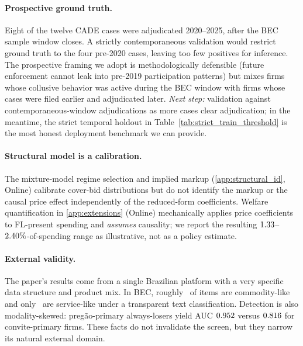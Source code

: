 \paragraph{Prospective ground truth.}
Eight of the twelve CADE cases were adjudicated 2020--2025,
after the BEC sample window closes. A strictly contemporaneous
validation would restrict ground truth to the four pre-2020
cases, leaving too few positives for inference. The
prospective framing we adopt is methodologically defensible
(future enforcement cannot leak into pre-2019 participation
patterns) but mixes firms whose collusive behavior was active
during the BEC window with firms whose cases were filed
earlier and adjudicated later. \emph{Next step:} validation
against contemporaneous-window adjudications as more cases
clear adjudication; in the meantime, the strict temporal
holdout in Table~\ref{tab:strict_train_threshold} is the most
honest deployment benchmark we can provide.

\paragraph{Structural model is a calibration.}
The mixture-model regime selection and implied markup
(\ref{app:structural_id}, Online) calibrate cover-bid
distributions but do not identify the markup or the causal
price effect independently of the reduced-form coefficients.
Welfare quantification in \ref{app:extensions} (Online)
mechanically applies price coefficients to FL-present spending
and \emph{assumes} causality; we report the resulting
$1.33$--$2.40\%$-of-spending range as illustrative, not as a
policy estimate.

\paragraph{External validity.}
The paper's results come from a single Brazilian platform with a
very specific data structure and product mix. In BEC, roughly
\valExtCommodityShare\ of items are commodity-like and only
\valExtServiceShare\ are service-like under a transparent text
classification. Detection is also modality-skewed:
pregão-primary always-losers yield AUC $0.952$ versus
$0.816$ for convite-primary firms. These facts do not
invalidate the screen, but they narrow its natural external
domain.

